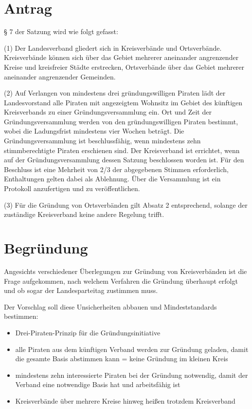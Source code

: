 \section{Antrag}

§ 7 der Satzung wird wie folgt gefasst:

(1) Der Landesverband gliedert sich in Kreisverbände und Ortsverbände. Kreisverbände können sich über das Gebiet mehrerer aneinander angrenzender Kreise und kreisfreier Städte erstrecken, Ortsverbände über das Gebiet mehrerer aneinander angrenzender Gemeinden.

(2) Auf Verlangen von mindestens drei gründungswilligen Piraten lädt der Landesvorstand alle Piraten mit angezeigtem Wohnsitz im Gebiet des künftigen Kreisverbands zu einer Gründungsversammlung ein. Ort und Zeit der Gründungsversammlung werden von den gründungswilligen Piraten bestimmt, wobei die Ladungsfrist mindestens vier Wochen beträgt. Die Gründungsversammlung ist beschlussfähig, wenn mindestens zehn stimmberechtigte Piraten erschienen sind. Der Kreisverband ist errichtet, wenn auf der Gründungsversammlung dessen Satzung beschlossen worden ist. Für den Beschluss ist eine Mehrheit von 2/3 der abgegebenen Stimmen erforderlich, Enthaltungen gelten dabei als Ablehnung. Über die Versammlung ist ein Protokoll anzufertigen und zu veröffentlichen.

(3) Für die Gründung von Ortsverbänden gilt Absatz 2 entsprechend, solange der zuständige Kreisverband keine andere Regelung trifft.

\section{Begründung}

Angesichts verschiedener Überlegungen zur Gründung von Kreisverbänden ist die Frage aufgekommen, nach welchem Verfahren die Gründung überhaupt erfolgt und ob sogar der Landesparteitag zustimmen muss.

Der Vorschlag soll diese Unsicherheiten abbauen und Mindeststandards bestimmen:

\begin{itemize}
\item
  Drei-Piraten-Prinzip für die Gründungsinitiative
\item
  alle Piraten aus dem künftigen Verband werden zur Gründung geladen, damit die gesamte Basis abstimmen kann = keine Gründung im kleinen Kreis
\item
  mindestens zehn interessierte Piraten bei der Gründung notwendig, damit der Verband eine notwendige Basis hat und arbeitsfähig ist
\item
  Kreisverbände über mehrere Kreise hinweg heißen trotzdem Kreisverband
\end{itemize}
